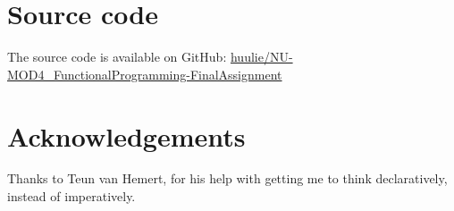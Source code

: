 \documentclass[a4paper, 11pt]{article}
\begin{document}
\small
\vspace{0.2cm}
\section*{Source code}\vspace{-0.1cm}
The source code is available on GitHub: \href{https://github.com/huulie/NU-MOD4_FunctionalProgramming-FinalAssignment}{huulie\//NU-MOD4\_FunctionalProgramming-FinalAssignment}

\section*{Acknowledgements}
Thanks to Teun van Hemert, for his help with getting me to think declaratively, instead of imperatively. 

 
\clearpage


\end{document}
